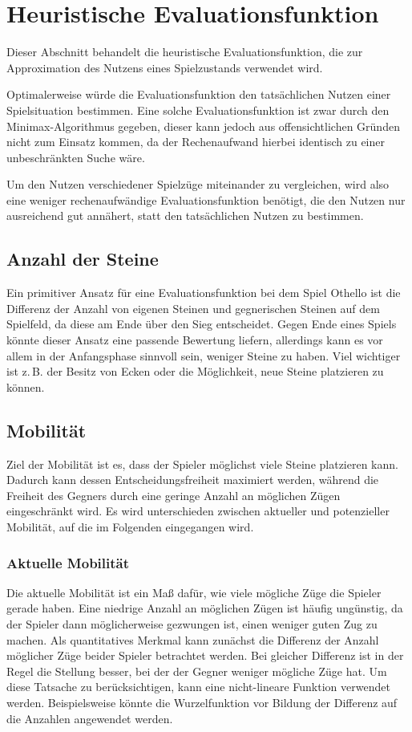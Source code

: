 \section{Heuristische Evaluationsfunktion}
\label{sec:heuristic}
Dieser Abschnitt behandelt die heuristische Evaluationsfunktion, die zur Approximation des Nutzens eines Spielzustands
verwendet wird.

Optimalerweise würde die Evaluationsfunktion den tatsächlichen Nutzen einer Spielsituation bestimmen. Eine solche
Evaluationsfunktion ist zwar durch den Minimax-Algorithmus gegeben, dieser kann jedoch aus offensichtlichen Gründen
nicht zum Einsatz kommen, da der Rechenaufwand hierbei identisch zu einer unbeschränkten Suche wäre.

Um den Nutzen verschiedener Spielzüge miteinander zu vergleichen, wird also eine weniger rechenaufwändige
Evaluationsfunktion benötigt, die den Nutzen nur ausreichend gut annähert, statt den tatsächlichen Nutzen zu bestimmen.

\subsection{Anzahl der Steine}
\label{sec:disccount}
Ein primitiver Ansatz für eine Evaluationsfunktion bei dem Spiel Othello ist die Differenz der Anzahl von eigenen
Steinen und gegnerischen Steinen auf dem Spielfeld, da diese am Ende über den Sieg entscheidet. Gegen Ende eines Spiels
könnte dieser Ansatz eine passende Bewertung liefern, allerdings kann es vor allem in der Anfangsphase sinnvoll sein,
weniger Steine zu haben. Viel wichtiger ist z.\,B. der Besitz von Ecken oder die Möglichkeit, neue Steine platzieren zu
können.

\subsection{Mobilität}
\label{sec:mobility}
Ziel der Mobilität ist es, dass der Spieler möglichst viele Steine platzieren kann. Dadurch kann dessen
Entscheidungsfreiheit maximiert werden, während die Freiheit des Gegners durch eine geringe Anzahl an möglichen Zügen
eingeschränkt wird. Es wird unterschieden zwischen aktueller und potenzieller Mobilität, auf die im Folgenden
eingegangen wird.
\cite[S.~7f.]{evaluationfunctions}

\subsubsection{Aktuelle Mobilität}
\label{sec:theorycurrentmobility}
Die aktuelle Mobilität ist ein Maß dafür, wie viele mögliche Züge die Spieler gerade haben. Eine niedrige Anzahl an
möglichen Zügen ist häufig ungünstig, da der Spieler dann möglicherweise gezwungen ist, einen weniger guten Zug zu
machen. Als quantitatives Merkmal kann zunächst die Differenz der Anzahl möglicher Züge beider Spieler betrachtet
werden. Bei gleicher Differenz ist in der Regel die Stellung besser, bei der der Gegner weniger mögliche Züge hat. Um
diese Tatsache zu berücksichtigen, kann eine nicht-lineare Funktion verwendet werden. Beispielsweise könnte die
Wurzelfunktion vor Bildung der Differenz auf die Anzahlen angewendet werden.
\cite[S.~7]{evaluationfunctions}

